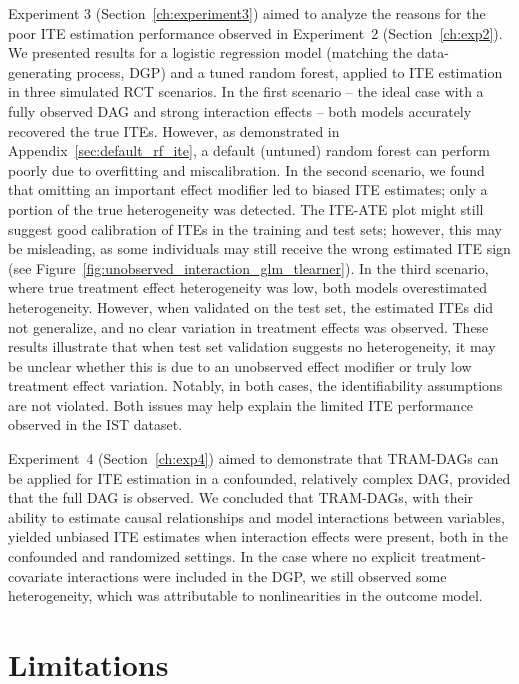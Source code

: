 \medskip

Experiment 3 (Section~\ref{ch:experiment3}) aimed to analyze the reasons for the poor ITE estimation performance observed in Experiment~2 (Section~\ref{ch:exp2}). We presented results for a logistic regression model (matching the data-generating process, DGP) and a tuned random forest, applied to ITE estimation in three simulated RCT scenarios.
In the first scenario -- the ideal case with a fully observed DAG and strong interaction effects -- both models accurately recovered the true ITEs. However, as demonstrated in Appendix~\ref{sec:default_rf_ite}, a default (untuned) random forest can perform poorly due to overfitting and miscalibration.
In the second scenario, we found that omitting an important effect modifier led to biased ITE estimates; only a portion of the true heterogeneity was detected. The ITE-ATE plot might still suggest good calibration of ITEs in the training and test sets; however, this may be misleading, as some individuals may still receive the wrong estimated ITE sign (see Figure~\ref{fig:unobserved_interaction_glm_tlearner}).
In the third scenario, where true treatment effect heterogeneity was low, both models overestimated heterogeneity. However, when validated on the test set, the estimated ITEs did not generalize, and no clear variation in treatment effects was observed. These results illustrate that when test set validation suggests no heterogeneity, it may be unclear whether this is due to an unobserved effect modifier or truly low treatment effect variation. Notably, in both cases, the identifiability assumptions are not violated. Both issues may help explain the limited ITE performance observed in the IST dataset.

\medskip

Experiment~4 (Section~\ref{ch:exp4}) aimed to demonstrate that TRAM-DAGs can be applied for ITE estimation in a confounded, relatively complex DAG, provided that the full DAG is observed. We concluded that TRAM-DAGs, with their ability to estimate causal relationships and model interactions between variables, yielded unbiased ITE estimates when interaction effects were present, both in the confounded and randomized settings. In the case where no explicit treatment-covariate interactions were included in the DGP, we still observed some heterogeneity, which was attributable to nonlinearities in the outcome model.



\section{Limitations}

